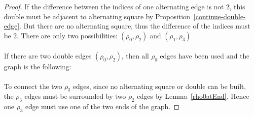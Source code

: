 \begin{proof}
  If the difference between the indices of one alternating edge is not 2, this double must be adjacent to alternating square by Proposition~\ref{continue-double-edge}. But there are no alternating square, thus the difference of the indices must be 2. There are only two possibilities: $(\rho_0, \rho_2)$ and $(\rho_1, \rho_3)$

  \paragraph{}
  If there are two double edges $(\rho_0, \rho_2)$, then all $\rho_0$ edges have been used and the graph is the following:

  \begin{figure}[H]
    \begin{center}
      \caption{}
    \end{center}
  \end{figure}

  \paragraph{}
  To connect the two $\rho_3$ edges, since no alternating square or double can be built, the $\rho_3$ edges must be surrounded by two $\rho_2$ edges by Lemma~\ref{rho0atEnd}. Hence one $\rho_3$ edge must use one of the two ends of the graph.


\end{proof}
